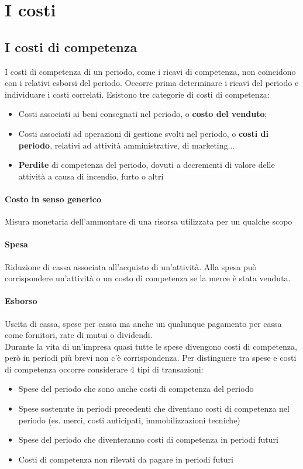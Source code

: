 \documentclass{report}
\begin{document}
	\section{I costi}
	\subsection{I costi di competenza}
	I costi di competenza di un periodo, come i ricavi di competenza, non coincidono con i relativi esborsi del periodo. Occorre prima determinare i ricavi del periodo e individuare i costi correlati.
	Esistono tre categorie di costi di competenza:
	\begin{itemize}
		\item Costi associati ai beni consegnati nel periodo, o \textbf{costo del venduto};
		\item Costi associati ad operazioni di gestione svolti nel periodo, o \textbf{costi di periodo}, relativi ad attività amministrative, di marketing...
		\item \textbf{Perdite} di competenza del periodo, dovuti a decrementi di valore delle attività a causa di incendio, furto o altri
	\end{itemize}
	\paragraph{Costo in senso generico} Misura monetaria dell'ammontare di una risorsa utilizzata per un qualche scopo
	\paragraph{Spesa} Riduzione di cassa associata all'acquisto di un'attività. Alla spesa può corrispondere un'attività o un costo di competenza se la merce è stata venduta.
	\paragraph{Esborso} Uscita di cassa, spese per cassa ma anche un qualunque pagamento per cassa come fornitori, rate di mutui o dividendi.
	\medskip \\Durante la vita di un'impresa quasi tutte le spese divengono costi di competenza, però in periodi più brevi non c'è corrispondenza. Per distinguere tra spese  e costi di competenza occorre considerare 4 tipi di transazioni:
	\begin{itemize}
		\item Spese del periodo che sono anche costi di competenza del periodo
		\item Spese sostenute in periodi precedenti che diventano costi di competenza nel periodo (es. merci, costi anticipati, immobilizzazioni tecniche)
		\item Spese del periodo che diventeranno costi di competenza in periodi futuri
		\item Costi di competenza non rilevati da pagare in periodi futuri
	\end{itemize}
\end{document}
